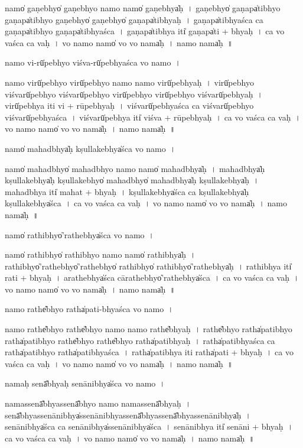 \documentclass[parskip, DIV=14]{scrartcl}
\begin{document}
{namo̍ ga॒ṇebhyo̍ ga॒ṇebhyo॒ namo॒ namo̍ ga॒ṇebhya̍ḥ~।
ga॒ṇebhyo̍ ga॒ṇapa̍tibhyo ga॒ṇapa̍tibhyo ga॒ṇebhyo̍ ga॒ṇebhyo̍ ga॒ṇapa̍tibhyaḥ~।
ga॒ṇapa̍tibhyaśca ca ga॒ṇapa̍tibhyo ga॒ṇapa̍tibhyaśca~।
ga॒ṇapa̍tibhya॒ iti̍ ga॒ṇapa̍ti + bhya॒ḥ~।
ca॒ vo॒ va॒śca॒ ca॒ va॒ḥ~।
vo॒ namo॒ namo̍ vo vo॒ nama̍ḥ~।
namo॒ nama̍ḥ~॥ 

namo॒ vi-rū̍pebhyo vi॒śva-rū̍pebhyaśca vo॒ namo॒~।

namo॒ virū̍pebhyo॒   virū̍pebhyo॒ namo॒ namo॒ virū̍pebhyaḥ~।
virū̍pebhyo vi॒śvarū̍pebhyo॒ vi॒śvarū̍pebhyo॒ virū̍pebhyo॒ virū̍pebhyo vi॒śvarū̍pebhyaḥ~।
virū̍pebhya॒ iti॒ vi + rū॒pe॒bhya॒ḥ~।
vi॒śvarū̍pebhyaśca ca vi॒śvarū̍pebhyo vi॒śvarū̍pebhyaśca~।
vi॒śvarū̍pebhya॒ iti̍ vi॒śva + rū॒pe॒bhya॒ḥ~।
ca॒ vo॒ va॒śca॒ ca॒ va॒ḥ~।
vo॒ namo॒ namo̍ vo vo॒ nama̍ḥ~।
namo॒ nama̍ḥ~॥ 

namo̍ ma॒hadbhya̍ḥ kṣulla॒kebhya̍śca vo॒ namo॒~।

namo̍ ma॒hadbhyo̍ ma॒hadbhyo॒ namo॒ namo̍ ma॒hadbhya̍ḥ~।
ma॒hadbhya̍ḥ kṣulla॒kebhya̍ḥ kṣulla॒kebhyo̍ ma॒hadbhyo̍ ma॒hadbhya̍ḥ kṣulla॒kebhya̍ḥ~।
ma॒hadbhya॒ iti̍ ma॒hat + bhya॒ḥ~।
kṣu॒lla॒kebhya̍śca ca kṣulla॒kebhya̍ḥ kṣulla॒kebhya̍śca~।
ca॒ vo॒ va॒śca॒ ca॒ va॒ḥ~।
vo॒ namo॒ namo̍ vo vo॒ nama̍ḥ~।
namo॒ nama̍ḥ~॥ 

namo̍ ra॒thibhyo̍'ra॒thebhya̍śca vo॒ namo॒~।

namo̍ ra॒thibhyo̍ ra॒thibhyo॒ namo॒ namo̍ ra॒thibhya̍ḥ~।
ra॒thibhyo̍'ra॒thebhyo̍'ra॒thebhyo̍ ra॒thibhyo̍ ra॒thibhyo̍'ra॒thebhya̍ḥ~।
ra॒thibhya॒ iti̍ ra॒ti + bhya॒ḥ~।
a॒ra॒thebhya̍śca cāra॒thebhyo̍'ra॒thebhya̍śca~।
ca॒ vo॒ va॒śca॒ ca॒ va॒ḥ~।
vo॒ namo॒ namo̍ vo vo॒ nama̍ḥ~।
namo॒ nama̍ḥ~॥ 

namo॒ rathe̎bhyo॒ ratha̍pati-bhyaśca vo॒ namo॒~।

namo॒ rathe̎bhyo॒ rathe̎bhyo॒ namo॒ namo॒ rathe̎bhyaḥ~।
rathe̎bhyo॒ ratha̍patibhyo॒ ratha̍patibhyo॒ rathe̎bhyo॒ rathe̎bhyo॒ ratha̍patibhyaḥ~।
ratha̍patibhyaśca ca॒ ratha̍patibhyo॒ ratha̍patibhyaśca~।
ratha̍patibhya॒ iti॒ ratha̍pati + bhya॒ḥ~।
ca॒ vo॒ va॒śca॒ ca॒ va॒ḥ~।
vo॒ namo॒ namo̍ vo vo॒ nama̍ḥ~।
namo॒ nama̍ḥ~॥ 

nama॒ḥ senā̎bhyaḥ senā॒nibhya̍śca vo॒ namo॒~।

nama॒ssenā̎bhya॒ssenā̎bhyo॒ namo॒ nama॒ssenā̎bhyaḥ~।
senā̎bhyassenā॒nibhya̍ssenā॒nibhya॒ssenā̎bhya॒ssenā̎bhyassenā॒nibhya̍ḥ~।
se॒nā॒nibhya̍śca ca senā॒nibhya̍ssenā॒nibhya̍śca~।
se॒nā॒nibhya॒ iti̍ senā॒ni + bhya॒ḥ~।
ca॒ vo॒ va॒śca॒ ca॒ va॒ḥ~।
vo॒ namo॒ namo̍ vo vo॒ nama̍ḥ~।
namo॒ nama̍ḥ~॥ 

}
\end{document}
